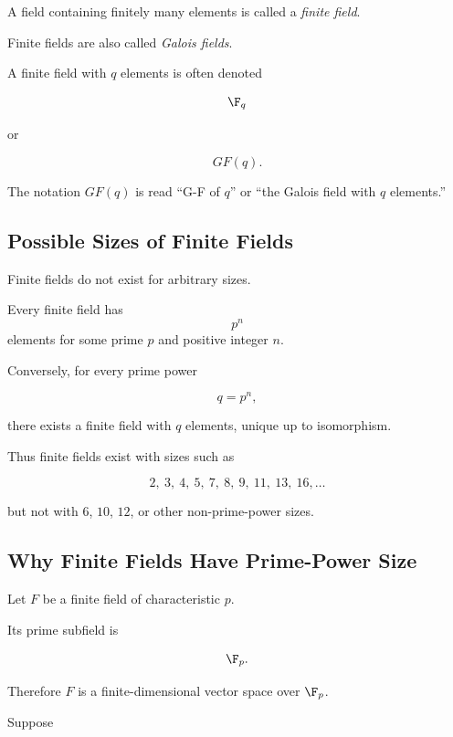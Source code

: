 A field containing finitely many elements is called a
\emph{finite field}.

Finite fields are also called \emph{Galois fields}.

A finite field with \(q\) elements is often denoted

\[ \F_q \]

or

\[ GF(q). \]

The notation \(GF(q)\) is read ``G-F of \(q\)'' or ``the Galois field with
\(q\) elements.''

\subsection{Possible Sizes of Finite Fields}
\label{subsec:finite-field-orders}

Finite fields do not exist for arbitrary sizes.

\begin{theorem}
Every finite field has
\[ p^n \]
elements for some prime \(p\) and positive integer \(n\).
\end{theorem}

Conversely, for every prime power

\[ q=p^n, \]

there exists a finite field with \(q\) elements, unique up to isomorphism.

Thus finite fields exist with sizes such as

\[ 2,\ 3,\ 4,\ 5,\ 7,\ 8,\ 9,\ 11,\ 13,\ 16,\ldots \]

but not with \(6\), \(10\), \(12\), or other non-prime-power sizes.

\subsection{Why Finite Fields Have Prime-Power Size}
\label{subsec:finite-fields-prime-power}

Let \(F\) be a finite field of characteristic \(p\).

Its prime subfield is

\[ \F_p. \]

Therefore \(F\) is a finite-dimensional vector space over \(\F_p\).

Suppose

